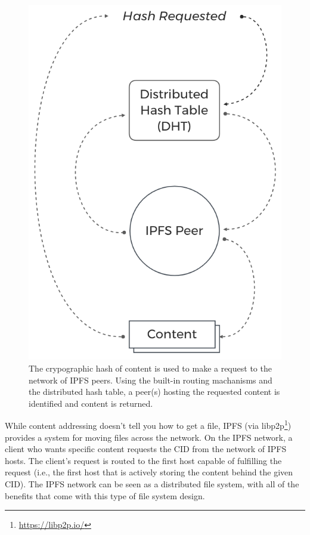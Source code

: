 \documentclass{textile}
\begin{document}
\begin{figure}
  \includegraphics[width=\linewidth]{figures/Hash_Request.png}
  \caption{The crypographic hash of content is used to make a request to the network of IPFS peers. Using the built-in routing machanisms and the distributed hash table, a peer(s) hosting the requested content is identified and content is returned. }
  \label{fig:contentaddressing}
\end{figure}

While content addressing doesn't tell you how to get a file, IPFS (via libp2p\footnote{\url{https://libp2p.io/}}) provides a system for moving files across the network.  On the IPFS network, a client who wants specific content requests the CID from the network of IPFS hosts. The client's request is routed to the first host capable of fulfilling the request (i.e., the first host that is actively storing the content behind the given CID). The IPFS network can be seen as a distributed file system, with all of the benefits that come with this type of file system design.
\end{document}
